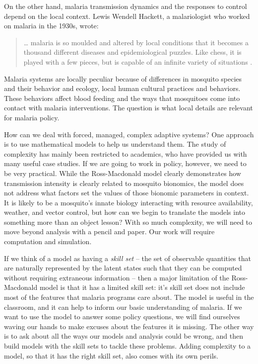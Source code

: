 \documentclass[
]{book}
\begin{document}
On the other hand, malaria transmission dynamics and the responses to control depend on the local context. Lewis Wendell Hackett, a malariologist who worked on malaria in the 1930s, wrote:

\begin{quote}
\ldots{} malaria is so moulded and altered by local conditions that it becomes a thousand different diseases and epidemiological puzzles. Like chess, it is played with a few pieces, but is capable of an infinite variety of situations \autocite{HackettLW1937MalariaEurope}.
\end{quote}

Malaria systems are locally peculiar because of differences in mosquito species and their behavior and ecology, local human cultural practices and behaviors. These behaviors affect blood feeding and the ways that mosquitoes come into contact with malaria interventions. The question is what local details are relevant for malaria policy.

How can we deal with forced, managed, complex adaptive systems? One approach is to use mathematical models to help us understand them. The study of complexity has mainly been restricted to academics, who have provided us with many useful case studies. If we are going to work in policy, however, we need to be very practical. While the Ross-Macdonald model clearly demonstrates how transmission intensity is clearly related to mosquito bionomics, the model does not address what factors set the values of those bionomic parameters in context. It is likely to be a mosquito's innate biology interacting with resource availability, weather, and vector control, but how can we begin to translate the models into something more than an object lesson? With so much complexity, we will need to move beyond analysis with a pencil and paper. Our work will require computation and simulation.

If we think of a model as having a \emph{skill set} -- the set of observable quantities that are naturally represented by the latent states such that they can be computed without requiring extraneous information -- then a major limitation of the Ross-Macdonald model is that it has a limited skill set: it's skill set does not include most of the features that malaria programs care about. The model is useful in the classroom, and it can help to inform our basic understanding of malaria. If we want to use the model to answer some policy questions, we will find ourselves waving our hands to make excuses about the features it is missing. The other way is to ask about all the ways our models and analysis could be wrong, and then build models with the skill sets to tackle these problems. Adding complexity to a model, so that it has the right skill set, also comes with its own perils.
\end{document}

